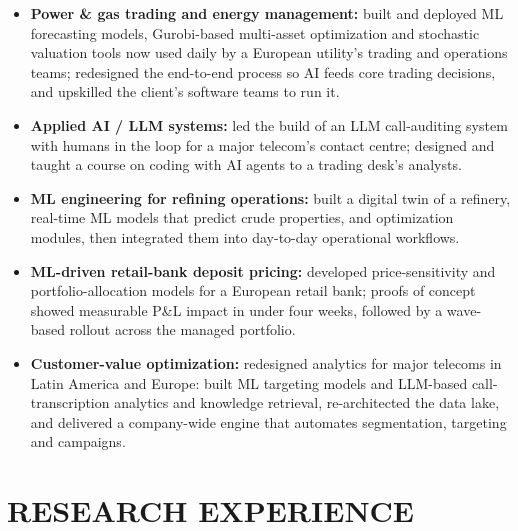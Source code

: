 \documentclass[10pt,a4paper]{article}
\begin{document}
\begin{itemize}

  \item
  \textbf{Power \& gas trading and energy management:}
  built and deployed ML forecasting models, Gurobi-based multi-asset optimization and stochastic
  valuation tools now used daily by a European utility's trading and operations teams; redesigned the
  end-to-end process so AI feeds core trading decisions, and upskilled the client's software teams to run it.

  \item
  \textbf{Applied AI / LLM systems:}
  led the build of an LLM call-auditing system with humans in the loop for a major telecom's
  contact centre; designed and taught a course on coding with AI agents to a trading desk's analysts.

  \item
  \textbf{ML engineering for refining operations:}
  built a digital twin of a refinery, real-time ML models that predict crude properties, and
  optimization modules, then integrated them into day-to-day operational workflows.

  \item
  \textbf{ML-driven retail-bank deposit pricing:}
  developed price-sensitivity and portfolio-allocation models for a European retail bank; proofs of
  concept showed measurable P\&L impact in under four weeks, followed by a wave-based rollout across the managed portfolio.

  \item
  \textbf{Customer-value optimization:}
  redesigned analytics for major telecoms in Latin America and Europe: built ML targeting models and
  LLM-based call-transcription analytics and knowledge retrieval, re-architected the data lake, and
  delivered a company-wide engine that automates segmentation, targeting and campaigns.

\end{itemize}

\vspace{0.15em}


\section{RESEARCH EXPERIENCE}

\small
\end{document}
